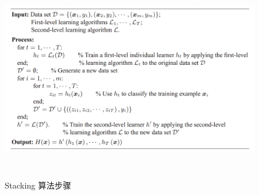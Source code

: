 \documentclass[12pt,a4paper,oneside]{article}
\begin{document}
\begin{CJK*}{UTF8}{gbsn}
\begin{figure}[H]
\centering
\includegraphics[width=6in,height=3.5in]{stacking}
\caption{Stacking 算法步骤}
\end{figure}



\end{CJK*}
\end{document}
